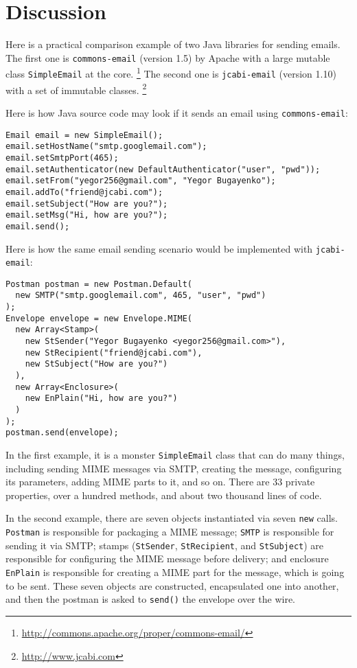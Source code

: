 \documentclass[sigconf,10pt,nonacm=true]{acmart}
\newcommand{\code}[1]{\texttt{#1}}
\begin{document}
\section{Discussion}

Here is a practical comparison example of two Java libraries for sending emails.
The first one is \code{commons-email} (version 1.5) by Apache
with a large mutable class \code{SimpleEmail} at the core.%
\footnote{\url{http://commons.apache.org/proper/commons-email/}}
The second one is \code{jcabi-email} (version 1.10) with a set of immutable classes.%
\footnote{\url{http://www.jcabi.com}}

Here is how Java source code may look if it sends an email using \code{commons-email}:

\begin{verbatim}
Email email = new SimpleEmail();
email.setHostName("smtp.googlemail.com");
email.setSmtpPort(465);
email.setAuthenticator(new DefaultAuthenticator("user", "pwd"));
email.setFrom("yegor256@gmail.com", "Yegor Bugayenko");
email.addTo("friend@jcabi.com");
email.setSubject("How are you?");
email.setMsg("Hi, how are you?");
email.send();
\end{verbatim}

Here is how the same email sending scenario would be
implemented with \code{jcabi-email}:

\begin{verbatim}
Postman postman = new Postman.Default(
  new SMTP("smtp.googlemail.com", 465, "user", "pwd")
);
Envelope envelope = new Envelope.MIME(
  new Array<Stamp>(
    new StSender("Yegor Bugayenko <yegor256@gmail.com>"),
    new StRecipient("friend@jcabi.com"),
    new StSubject("How are you?")
  ),
  new Array<Enclosure>(
    new EnPlain("Hi, how are you?")
  )
);
postman.send(envelope);
\end{verbatim}

In the first example, it is a monster \code{SimpleEmail} class that can do many things, including
sending MIME messages via SMTP, creating the message, configuring
its parameters, adding MIME parts to it, and so on. There are 33 private properties, over
a hundred methods, and about two thousand lines of code.

In the second example, there are seven objects instantiated via seven \code{new} calls.
\code{Postman} is responsible for packaging a MIME message; \code{SMTP} is
responsible for sending it via SMTP; stamps (\code{StSender}, \code{StRecipient},
and \code{StSubject}) are responsible for configuring the MIME message before
delivery; and enclosure \code{EnPlain} is responsible for creating a MIME part
for the message, which is going to be sent. These seven objects are constructed,
encapsulated one into another, and then the postman is asked to \code{send()}
the envelope over the wire.
\end{document}
